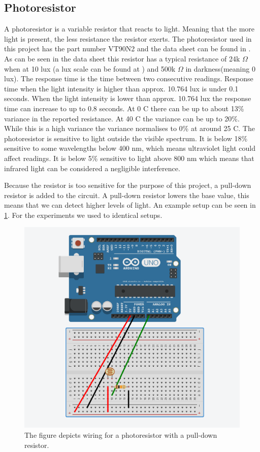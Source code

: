 \subsection{Photoresistor}\label{sub:photoresistor}
A photoresistor is a variable resistor that reacts to light. Meaning that the more light is present, the less resistance the resistor exerts. The photoresistor used in this project has the part number VT90N2 and the data sheet can be found in \cite{photoresistor_sheet}. As can be seen in the data sheet this resistor has a typical resistance of 24k $\Omega$ when at 10 lux (a lux scale can be found at \cite{lux_scale}) and 500k $\Omega$ in darkness(meaning 0 lux). The response time is the time between two consecutive readings. Response time when the light intensity is higher than approx. 10.764 lux is under 0.1 seconds. When the light intensity is lower than approx. 10.764 lux the response time can increase to up to 0.8 seconds. At 0 \degree C there can be up to about 13\% variance in the reported resistance. At 40 \degree C the variance can be up to 20\%. While this is a high variance the variance normalises to 0\% at around 25 \degree C. The photoresistor is sensitive to light outside the visible spectrum. It is below 18\% sensitive to some wavelengths below 400 nm, which means ultraviolet light could affect readings. It is below 5\% sensitive to light above 800 nm which means that infrared light can be considered a negligible interference.

Because the resistor is too sensitive for the purpose of this project, a pull-down resistor is added to the circuit\cite{pulldown_resistor}. A pull-down resistor lowers the base value, this means that we can detect higher levels of light. An example setup can be seen in \cref{fig:arduino_photoresistor_wiring}. For the experiments we used to identical setups.

\begin{figure}[htbp]
  \centering
  \includegraphics[width=\textwidth]{Implementation/hardware/PhotoSensorTests/Images/photoresistor_setup.png}
  \caption{The figure depicts wiring for a photoresistor with a pull-down resistor.}\label{fig:arduino_photoresistor_wiring}
\end{figure}
